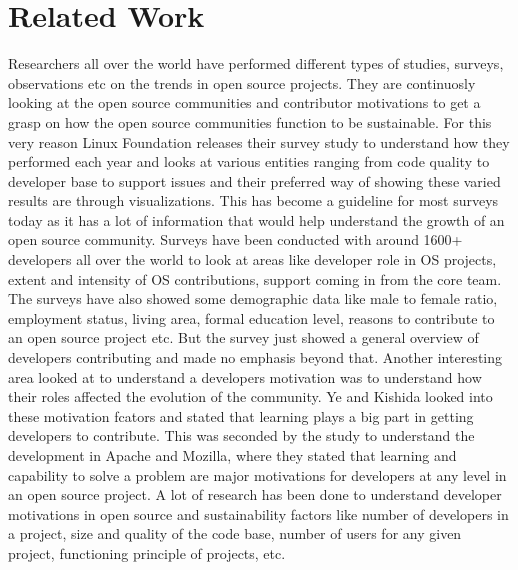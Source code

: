 \documentclass[seploa]{beavtex}
\begin{document}
\chapter{Related Work}
Researchers all over the world have performed different types of studies, surveys, observations etc on the trends in open source projects. They are continuosly looking at the open source communities and contributor motivations to get a grasp on how the open source communities function to be sustainable. For this very reason Linux Foundation releases their survey study to understand how they performed each year and looks at various entities ranging from code quality to developer base to support issues and their preferred way of showing these varied results are through visualizations\cite{lfs}. This has become a guideline for most surveys today as it has a lot of information that would help understand the growth of an open source community. Surveys have been conducted with around 1600+ developers all over the world to look at areas like developer role in OS projects, extent and intensity of OS contributions, support coming in from the core team. The surveys have also showed some demographic data like male to female ratio, employment status, living area, formal education level, reasons to contribute to an open source project etc\cite{david2003}. But the survey just showed a general overview of developers contributing and made no emphasis beyond that. Another interesting area looked at to understand a developers motivation was to understand how their roles affected the evolution of the community. Ye and Kishida looked into these motivation fcators and stated that learning plays a big part in getting developers to contribute\cite{kishida2003}. This was seconded by the study to understand the development in Apache and Mozilla, where they stated that learning and capability to solve a problem are major motivations for developers at any level in an open source project\cite{mockus2002}. A lot of research has been done to understand developer motivations in open source and sustainability factors like number of developers in a project\cite{david2003, rishab2002}, size and quality of the code base\cite{marc2014}, number of users for any given project\cite{rishab2002}, functioning principle of projects\cite{tarja2013}, etc.
\end{document}
